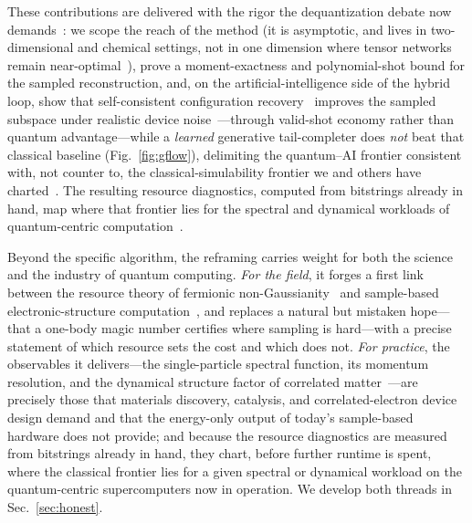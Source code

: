 These contributions are delivered with the rigor the dequantization debate now
demands~\cite{leechan2023,reinholdt2025,belagali2026}: we scope the reach of the method (it
is asymptotic, and lives in two-dimensional and chemical settings, not in one dimension where tensor
networks remain near-optimal~\cite{whitedmrg1992,schollwock2011}), prove a moment-exactness and polynomial-shot bound
for the sampled reconstruction, and, on the artificial-intelligence side of the hybrid loop, show that
self-consistent configuration recovery~\cite{robledomoreno2025} improves the sampled subspace under
realistic device noise~\cite{wray2025,vaquero2026}---through valid-shot economy rather than quantum advantage---while a \emph{learned}
generative tail-completer does \emph{not} beat that classical baseline (Fig.~\ref{fig:gflow}), delimiting
the quantum--AI frontier consistent with, not counter to, the classical-simulability frontier we and
others have charted~\cite{review,reinholdt2025}. The
resulting resource diagnostics, computed from bitstrings already in hand, map where that frontier lies
for the spectral and dynamical workloads of quantum-centric
computation~\cite{robledomoreno2025,shirakawa2025}.

Beyond the specific algorithm, the reframing carries weight for both the science and the industry of
quantum computing. \emph{For the field}, it forges a first link between the resource theory of
fermionic non-Gaussianity~\cite{hebenstreit2019,sierant2026} and sample-based electronic-structure
computation~\cite{robledomoreno2025,kanno2023}, and replaces a natural but mistaken hope---that a
one-body magic number certifies where sampling is hard---with a precise statement of which resource
sets the cost and which does not. \emph{For practice}, the observables it delivers---the single-particle
spectral function, its momentum resolution, and the dynamical structure factor of correlated
matter~\cite{damascelli2003,dmft1996}---are precisely those that materials discovery, catalysis, and
correlated-electron device design demand and that the energy-only output of today's sample-based
hardware does not provide; and because the resource diagnostics are measured from bitstrings already in
hand, they chart, before further runtime is spent, where the classical frontier lies for a given
spectral or dynamical workload on the quantum-centric supercomputers now in
operation. We develop both threads in Sec.~\ref{sec:honest}.

